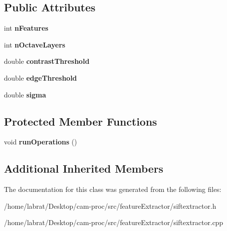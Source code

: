 \subsection*{Public Attributes}
\begin{DoxyCompactItemize}
\item 
int {\bfseries n\+Features}\hypertarget{classSiftExtractor_a6e368fc89c80cce677cd78e466dae51f}{}\label{classSiftExtractor_a6e368fc89c80cce677cd78e466dae51f}

\item 
int {\bfseries n\+Octave\+Layers}\hypertarget{classSiftExtractor_a2452e1328a1c25face8c9952552ed9a2}{}\label{classSiftExtractor_a2452e1328a1c25face8c9952552ed9a2}

\item 
double {\bfseries contrast\+Threshold}\hypertarget{classSiftExtractor_a3664c2d5a691aa0e4b688fbd146fce30}{}\label{classSiftExtractor_a3664c2d5a691aa0e4b688fbd146fce30}

\item 
double {\bfseries edge\+Threshold}\hypertarget{classSiftExtractor_a4f0de584925ef01976b49c42637e016a}{}\label{classSiftExtractor_a4f0de584925ef01976b49c42637e016a}

\item 
double {\bfseries sigma}\hypertarget{classSiftExtractor_aaacf9c973bb4f64c9d024c840af691b9}{}\label{classSiftExtractor_aaacf9c973bb4f64c9d024c840af691b9}

\end{DoxyCompactItemize}
\subsection*{Protected Member Functions}
\begin{DoxyCompactItemize}
\item 
void {\bfseries run\+Operations} ()\hypertarget{classSiftExtractor_ad898aca196434fd053b8a0a0838eb55c}{}\label{classSiftExtractor_ad898aca196434fd053b8a0a0838eb55c}

\end{DoxyCompactItemize}
\subsection*{Additional Inherited Members}


The documentation for this class was generated from the following files\+:\begin{DoxyCompactItemize}
\item 
/home/labrat/\+Desktop/cam-\/proc/src/feature\+Extractor/siftextractor.\+h\item 
/home/labrat/\+Desktop/cam-\/proc/src/feature\+Extractor/siftextractor.\+cpp\end{DoxyCompactItemize}
